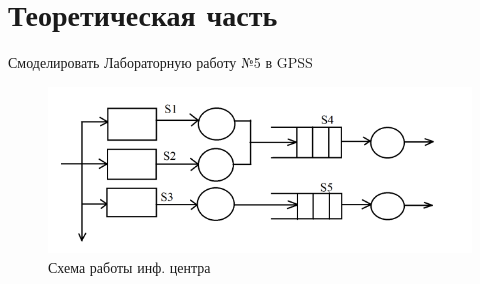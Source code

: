 \section{Теоретическая часть}
Смоделировать Лабораторную работу №5 в GPSS

\begin{figure}[h]
	\centering
	\includegraphics[width=0.7\linewidth]{shema1}
	\caption{Схема работы инф. центра}
	\label{fig:shema1}
\end{figure}
